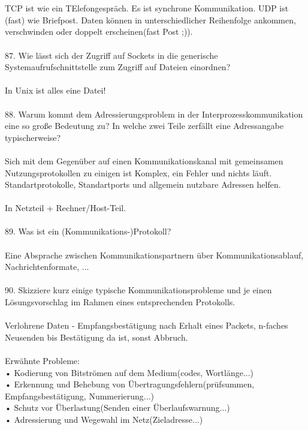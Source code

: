 \documentclass{article}
\begin{document}
\\
\\
TCP ist wie ein TElefongespr\"ach. Es ist synchrone Kommunikation. UDP ist (fast) wie Briefpost. Daten k\"onnen in unterschiedlicher Reihenfolge ankommen, verschwinden oder doppelt erscheinen(fast Post ;)).
\\
\\
87. Wie lässt sich der Zugriff auf Sockets in die generische Systemaufrufschnittstelle zum Zugriff
auf Dateien einordnen?
\\
\\
In Unix ist alles eine Datei!
\\
\\
88. Warum kommt dem Adressierungsproblem in der Interprozesskommunikation eine so große
Bedeutung zu? In welche zwei Teile zerfällt eine Adressangabe typischerweise?
\\
\\
Sich mit dem Gegen\"uber auf einen Kommunikationskanal mit gemeinsamen Nutzungsprotokollen zu einigen ist Komplex, ein Fehler und nichts l\"auft. Standartprotokolle, Standartports und allgemein nutzbare Adressen helfen.
\\
\\
In Netzteil + Rechner/Host-Teil.
\\
\\
89. Was ist ein (Kommunikations-)Protokoll?
\\
\\
Eine Absprache zwischen Kommunikationspartnern über Kommunikationsablauf, Nachrichtenformate, ...
\\
\\
90. Skizziere kurz einige typische Kommunikationsprobleme und je einen Lösungsvorschlag im
Rahmen eines entsprechenden Protokolls.
\\
\\
Verlohrene Daten - Empfangsbest\"atigung nach Erhalt eines Packets, n-faches Neusenden bis Best\"atigung da ist, sonst Abbruch.
\\
\\
Erw\"ahnte Probleme:\\
• Kodierung von Bitströmen auf dem Medium(codes, Wortl\"ange...)\\
• Erkennung und Behebung von Übertragungsfehlern(pr\"ufsummen, Empfangsbest\"atigung, Nummerierung...)\\
• Schutz vor Überlastung(Senden einer \"Uberlaufswarnung...)\\
• Adressierung und Wegewahl im Netz(Zieladresse...)\\
\end{document}
